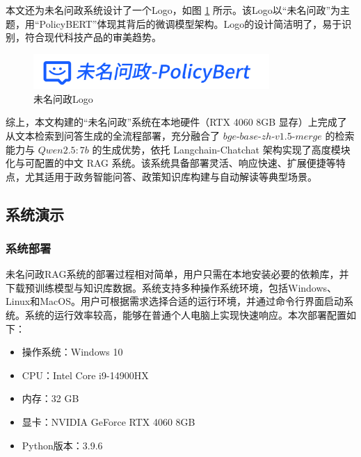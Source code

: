 \documentclass[12pt, a4paper]{ctexart}
\begin{document}
本文还为未名问政系统设计了一个Logo，如图 \ref{fig:WeiMingLogo} 所示。该Logo以“未名问政”为主题，用“PolicyBERT”体现其背后的微调模型架构。Logo的设计简洁明了，易于识别，符合现代科技产品的审美趋势。

\begin{figure}[H]
    \centering
    \includegraphics[width=0.8\textwidth]{./images/WeiMingPolicyLogo.png}
    \caption{未名问政Logo}
    \label{fig:WeiMingLogo}
\end{figure}

综上，本文构建的“未名问政”系统在本地硬件（RTX 4060 8GB 显存）上完成了从文本检索到问答生成的全流程部署，充分融合了 $bge\text{-}base\text{-}zh\text{-}v1.5\text{-}merge$ 的检索能力与 $Qwen2.5:7b$ 的生成优势，依托 Langchain-Chatchat 架构实现了高度模块化与可配置的中文 RAG 系统。该系统具备部署灵活、响应快速、扩展便捷等特点，尤其适用于政务智能问答、政策知识库构建与自动解读等典型场景。

\subsection{系统演示}

\subsubsection{系统部署}
未名问政RAG系统的部署过程相对简单，用户只需在本地安装必要的依赖库，并下载预训练模型与知识库数据。系统支持多种操作系统环境，包括Windows、Linux和MacOS。用户可根据需求选择合适的运行环境，并通过命令行界面启动系统。系统的运行效率较高，能够在普通个人电脑上实现快速响应。本次部署配置如下：
\begin{itemize}
    \item 操作系统：Windows 10
    \item CPU：Intel Core i9-14900HX
    \item 内存：32 GB
    \item 显卡：NVIDIA GeForce RTX 4060 8GB
    \item Python版本：3.9.6
\end{itemize}
\end{document}
